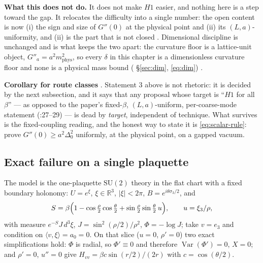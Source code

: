 
\textbf{What this does not do.} It does not make $H1$ easier, and nothing here is a step toward
the gap. It relocates the difficulty into a single number: the open content is now (i) the sign and
size of $G''(0)$ at the physical point and (ii) its $(L,a)$-uniformity, and (ii) is the part that
is not closed \LM. Dimensional discipline is unchanged and is what keeps the two apart: the
curvature floor is a lattice-unit object, $G''_a=a^2m_{\mathrm{phys}}^2$, so every $\delta$ in this
chapter is a dimensionless curvature floor and none is a physical mass bound
( \S\ref{sec:dim}, \eqref{eq:dim}) \LT.

\textbf{Corollary for route classes} \LN. Statement 3 above is not rhetoric: it is decided by the
next subsection, and it says that any proposal whose target is ``$H1$ for all $\beta$'' --- as
opposed to the paper's fixed-$\beta$, $(L,a)$-uniform, per-coarse-mode statement
(:27--29) --- is dead by \emph{target}, independent of technique. What
survives is the fixed-coupling reading, and the honest way to state it is
\eqref{eq:scalar-rule}: prove $G''(0)\ge a^2\Delta_0^2$ uniformly, at the physical point, on a
gapped vacuum.

\subsection{Exact failure on a single plaquette}
\label{sec:scalar-plaquette}

The model is the one-plaquette $\mathrm{SU}(2)$ theory in the flat chart with a fixed boundary
holonomy: $U=e^{\xi}$, $\xi\in\mathbb R^3$, $|\xi|<2\pi$, $B=e^{i\theta\sigma_3/2}$, and
\begin{equation}
S=\beta\Bigl(1-\cos\tfrac{\rho}{2}\cos\tfrac{\theta}{2}
+\sin\tfrac{\rho}{2}\sin\tfrac{\theta}{2}\,u\Bigr),\qquad u=\xi_3/\rho,
\label{eq:scalar-plaq-action}
\end{equation}
with measure $e^{-S}J\,d^3\xi$, $J=\sin^2(\rho/2)/\rho^2$, $\Phi=-\log J$; take $v=e_3$ and
condition on $\langle v,\xi\rangle=a_0=0$. On that slice ($u=0$, $\rho'=0$) two exact
simplifications hold: $\Phi$ is radial, so $\Phi'\equiv0$ and therefore
$\operatorname{Var}(\Phi')=0$, $X=0$; and $\rho'=0$, $u''=0$ give
$H_{vv}=\beta c\sin(r/2)/(2r)$ with $c=\cos(\theta/2)$.

